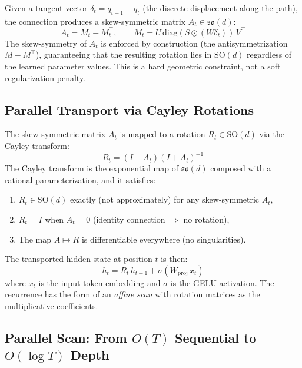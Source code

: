 \documentclass[11pt,a4paper]{article}
\theoremstyle{definition}
\theoremstyle{remark}
\newcommand{\SO}{\mathrm{SO}}
\begin{document}
Given a tangent vector $\delta_t = q_{t+1} - q_t$ (the discrete 
displacement along the path), the connection produces a 
skew-symmetric matrix $A_t \in \mathfrak{so}(d)$:
\begin{equation}
    A_t = M_t - M_t^\top, \qquad
    M_t = U \, \mathrm{diag}(S \odot (W \delta_t)) \, V^\top
\label{eq:skew-symmetric}
\end{equation}
The skew-symmetry of $A_t$ is enforced by construction (the 
antisymmetrization $M - M^\top$), guaranteeing that the resulting 
rotation lies in $\SO(d)$ regardless of the learned parameter 
values. This is a hard geometric constraint, not a soft 
regularization penalty.

\subsection{Parallel Transport via Cayley Rotations}
\label{subsec:parallel-transport}

The skew-symmetric matrix $A_t$ is mapped to a rotation $R_t \in 
\SO(d)$ via the Cayley transform:
\begin{equation}
    R_t = (I - A_t)(I + A_t)^{-1}
\label{eq:cayley-ym}
\end{equation}
The Cayley transform is the exponential map of $\mathfrak{so}(d)$ 
composed with a rational parameterization, and it satisfies:
\begin{enumerate}
    \item $R_t \in \SO(d)$ exactly (not approximately) for any 
    skew-symmetric $A_t$,
    \item $R_t = I$ when $A_t = 0$ (identity connection 
    $\Rightarrow$ no rotation),
    \item The map $A \mapsto R$ is differentiable everywhere 
    (no singularities).
\end{enumerate}

The transported hidden state at position $t$ is then:
\begin{equation}
    h_t = R_t \, h_{t-1} + \sigma(W_{\mathrm{proj}} \, x_t)
\label{eq:transport-recurrence}
\end{equation}
where $x_t$ is the input token embedding and $\sigma$ is the GELU 
activation. The recurrence has the form of an \emph{affine scan} 
with rotation matrices as the multiplicative coefficients.

\subsection{Parallel Scan: From $O(T)$ Sequential to $O(\log T)$ Depth}
\label{subsec:parallel-scan}
\end{document}
